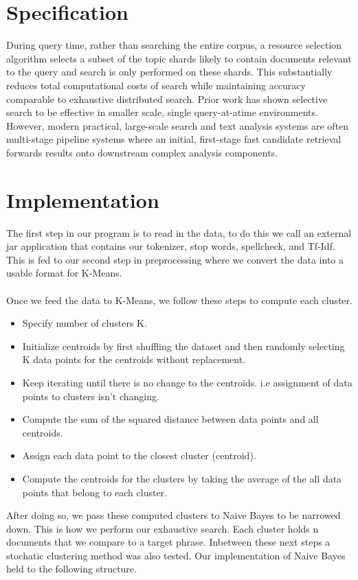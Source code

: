 \documentclass{article}
\begin{document}
\section{Specification}
During query time, rather than searching the entire corpus, a resource selection algorithm selects a subset of the topic shards likely to contain documents relevant to the query and search is only performed on these shards. This substantially reduces total computational costs of search while maintaining accuracy comparable to exhaustive distributed search. Prior work has shown selective search to be effective in smaller scale, single query-at-atime environments. However, modern practical, large-scale search and text analysis systems are often multi-stage pipeline systems where an initial, first-stage fast candidate retrieval forwards results onto downstream complex analysis components. 

\section{Implementation}

The first step in our program is to read in the data, to do this we call an external jar application that contains our tokenizer, stop words, spellcheck, and Tf-Idf. This is fed to our second step in preprocessing where we convert the data into a usable format for K-Means. 
\\\\
Once we feed the data to K-Means, we follow these steps to compute each cluster. 
\begin{itemize}
  \item Specify number of clusters K.
  \item Initialize centroids by first shuffling the dataset and then randomly selecting K data points for the centroids without replacement.
  \item Keep iterating until there is no change to the centroids. i.e assignment of data points to clusters isn’t changing.
  \item Compute the sum of the squared distance between data points and all centroids.
  \item Assign each data point to the closest cluster (centroid).
  \item Compute the centroids for the clusters by taking the average of the all data points that belong to each cluster.
\end{itemize}

After doing so, we pass these computed clusters to Naive Bayes to be narrowed down. This is how we perform our exhaustive search. Each cluster holds n documents that we compare to a target phrase. Inbetween these next steps a stochatic clustering method was also tested. Our implementation of Naive Bayes held to the following structure. 
\end{document}
